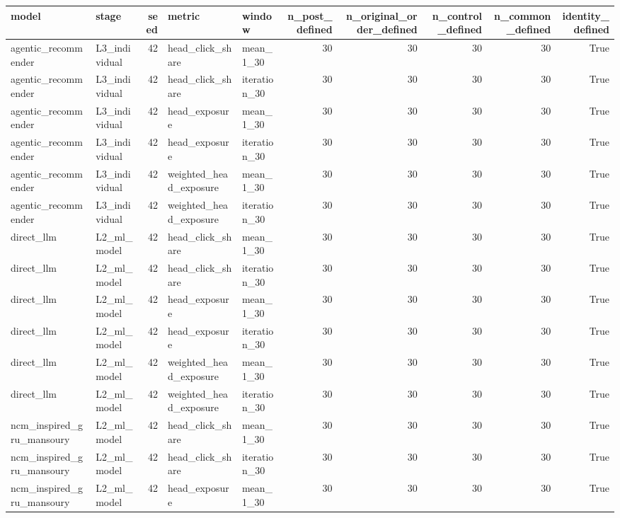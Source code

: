 \begin{table}[htbp!]
\centering
\small
\setlength{\tabcolsep}{3pt}
\renewcommand{\arraystretch}{1.1}
\begin{tabular}{llrllrrrrr}
\hline
model & stage & seed & metric & window & n\_post\_defined & n\_original\_order\_defined & n\_control\_defined & n\_common\_defined & identity\_defined \\
\hline
agentic\_recommender & L3\_individual & 42 & head\_click\_share & mean\_1\_30 & 30 & 30 & 30 & 30 & True \\
agentic\_recommender & L3\_individual & 42 & head\_click\_share & iteration\_30 & 30 & 30 & 30 & 30 & True \\
agentic\_recommender & L3\_individual & 42 & head\_exposure & mean\_1\_30 & 30 & 30 & 30 & 30 & True \\
agentic\_recommender & L3\_individual & 42 & head\_exposure & iteration\_30 & 30 & 30 & 30 & 30 & True \\
agentic\_recommender & L3\_individual & 42 & weighted\_head\_exposure & mean\_1\_30 & 30 & 30 & 30 & 30 & True \\
agentic\_recommender & L3\_individual & 42 & weighted\_head\_exposure & iteration\_30 & 30 & 30 & 30 & 30 & True \\
direct\_llm & L2\_ml\_model & 42 & head\_click\_share & mean\_1\_30 & 30 & 30 & 30 & 30 & True \\
direct\_llm & L2\_ml\_model & 42 & head\_click\_share & iteration\_30 & 30 & 30 & 30 & 30 & True \\
direct\_llm & L2\_ml\_model & 42 & head\_exposure & mean\_1\_30 & 30 & 30 & 30 & 30 & True \\
direct\_llm & L2\_ml\_model & 42 & head\_exposure & iteration\_30 & 30 & 30 & 30 & 30 & True \\
direct\_llm & L2\_ml\_model & 42 & weighted\_head\_exposure & mean\_1\_30 & 30 & 30 & 30 & 30 & True \\
direct\_llm & L2\_ml\_model & 42 & weighted\_head\_exposure & iteration\_30 & 30 & 30 & 30 & 30 & True \\
ncm\_inspired\_gru\_mansoury & L2\_ml\_model & 42 & head\_click\_share & mean\_1\_30 & 30 & 30 & 30 & 30 & True \\
ncm\_inspired\_gru\_mansoury & L2\_ml\_model & 42 & head\_click\_share & iteration\_30 & 30 & 30 & 30 & 30 & True \\
ncm\_inspired\_gru\_mansoury & L2\_ml\_model & 42 & head\_exposure & mean\_1\_30 & 30 & 30 & 30 & 30 & True \\

\end{tabular}
\end{table}
